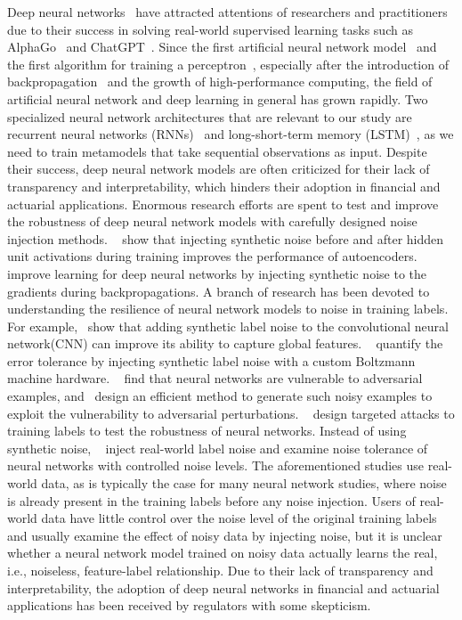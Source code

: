 \documentclass{article}
\begin{document}
Deep neural networks~\citep{hastie2009elements,lecun2015deep} have attracted attentions of researchers and practitioners due to their success in solving real-world supervised learning tasks such as AlphaGo~\citep{silver2016mastering} and ChatGPT~\citep{chatgpt}.
Since the first artificial neural network model~\citep{mcculloch1943logical} and the first algorithm for training a perceptron~\citep{rosenblatt1958perceptron}, especially after the introduction of backpropagation~\citep{rumelhart1985learning} and the growth of high-performance computing, the field of artificial neural network and deep learning in general has grown rapidly.
Two specialized neural network architectures that are relevant to our study are recurrent neural networks (RNNs)~\citep{williams1989learning,sutskever2014sequence} and long-short-term memory (LSTM)~\citep{hochreiter1997long,chung2014empirical}, as we need to train metamodels that take sequential observations as input.
Despite their success, deep neural network models are often criticized for their lack of transparency and interpretability, which hinders their adoption in financial and actuarial applications.
Enormous research efforts are spent to test and improve the robustness of deep neural network models with carefully designed noise injection methods.
~\cite{poole2014analyzing} show that injecting synthetic noise before and after hidden unit activations during training improves the performance of autoencoders.
~\cite{neelakantan2015adding} improve learning for deep neural networks by injecting synthetic noise to the gradients during backpropagations.
A branch of research has been devoted to understanding the resilience of neural network models to noise in training labels.
For example,~\cite{luo2016understanding} show that adding synthetic label noise to the convolutional neural network(CNN) can improve its ability to capture global features. 
~\cite{srivastava2014dropout} quantify the error tolerance by injecting synthetic label noise with a custom Boltzmann machine hardware.
~\cite{szegedy2013intriguing} find that neural networks are vulnerable to adversarial examples, and~\cite{goodfellow2014explaining} design an efficient method to generate such noisy examples to exploit the vulnerability to adversarial perturbations.
~\cite{carlini2017towards} design targeted attacks to training labels to test the robustness of neural networks. 
Instead of using synthetic noise, ~\cite{jiang2020beyond} inject real-world label noise and examine noise tolerance of neural networks with controlled noise levels.
The aforementioned studies use real-world data, as is typically the case for many neural network studies, where noise is already present in the training labels before any noise injection.
Users of real-world data have little control over the noise level of the original training labels and usually examine the effect of noisy data by injecting noise, but it is unclear whether a neural network model trained on noisy data actually learns the real, i.e., noiseless, feature-label relationship.
Due to their lack of transparency and interpretability, the adoption of deep neural networks in financial and actuarial applications has been received by regulators with some skepticism.
\end{document}
